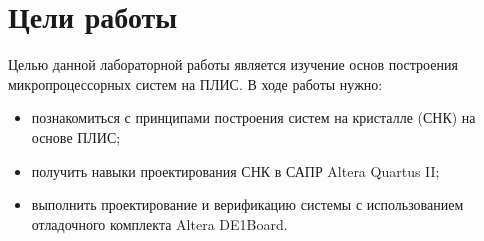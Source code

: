 \chapter*{Цели работы}
Целью данной лабораторной работы является изучение основ построения микропроцессорных систем на ПЛИС. 
В ходе работы нужно:
\begin{itemize}
	\item познакомиться с принципами построения систем на кристалле (СНК) на основе ПЛИС;
	\item получить навыки проектирования СНК в САПР Altera Quartus II;
	\item выполнить проектирование и верификацию системы с использованием отладочного комплекта Altera DE1Board.
\end{itemize}